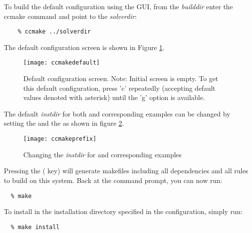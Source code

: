 To build the default configuration using the GUI, from the {\em builddir} enter
the ccmake command and point to the {\em solverdir}:

\begin{verbatim}
    % ccmake ../solverdir
\end{verbatim}

The default configuration screen is shown in Figure
\ref{f:ccmakedefault}. 
\begin{figure}[!ht]
{\centerline{\texttt{[image: ccmakedefault]}}}
\caption [Initial {\em ccmake} configuration screen]
{Default configuration screen. Note: Initial screen is empty.
To get this default configuration, press 'c' repeatedly (accepting default values denoted with asterisk)
until the 'g' option is available.}
\label{f:ccmakedefault}
\end{figure}

The default {\em instdir} for both {\sundials} and corresponding examples
can be changed by setting the  and
the  as shown in figure
\ref{f:ccmakeprefix}. 
\begin{figure}[!ht]
{\centerline{\texttt{[image: ccmakeprefix]}}}
\caption [Changing the {\em instdir}]
{Changing the {\em instdir} for {\sundials} and
corresponding {\id examples} }
\label{f:ccmakeprefix}
\end{figure}

Pressing the ( key) will generate makefiles including all dependencies
and all rules to build {\sundials} on this system. 
Back at the command prompt, you can now run:

\begin{verbatim}
  % make
\end{verbatim}

To install {\sundials} in the installation directory specified in the configuration, simply run:

\begin{verbatim}
  % make install
\end{verbatim}


